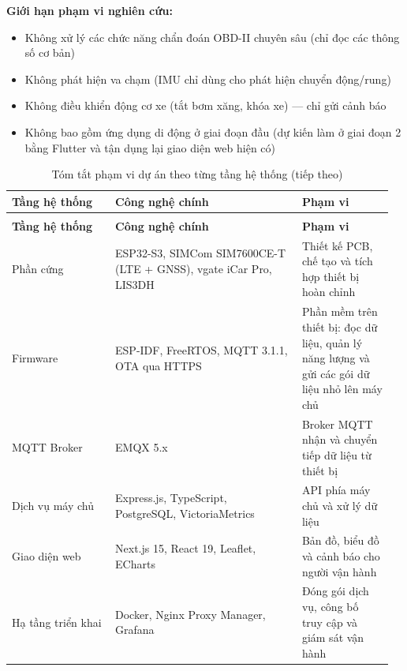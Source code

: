 \documentclass[a4paper]{extarticle}
\newcommand{\thesissettableid}[2]{%
  \renewcommand{\thetable}{#1}%
  \renewcommand{\theHtable}{#2}%
}
\providecommand{\tightlist}{%
  \setlength{\itemsep}{0pt}\setlength{\parskip}{0pt}}
\begin{document}
\textbf{Giới hạn phạm vi nghiên cứu:}

\begin{itemize}
\tightlist
\item
  Không xử lý các chức năng chẩn đoán OBD-II chuyên sâu (chỉ đọc các
  thông số cơ bản)
\item
  Không phát hiện va chạm (IMU chỉ dùng cho phát hiện chuyển động/rung)
\item
  Không điều khiển động cơ xe (tắt bơm xăng, khóa xe) --- chỉ gửi cảnh
  báo
\item
  Không bao gồm ứng dụng di động ở giai đoạn đầu (dự kiến làm ở giai
  đoạn 2 bằng Flutter và tận dụng lại giao diện web hiện có)
\end{itemize}

{\thesissettableid{1.1}{tab-ch1-project-scope-by-layer}
\def\LTcaptype{table}
\begin{longtable}{|L{0.261\linewidth}|L{0.470\linewidth}|L{0.234\linewidth}|}
\caption{Tóm tắt phạm vi dự án theo từng tầng hệ thống}\label{tab:ch1-project-scope-by-layer}\\
\hline \textbf{Tầng hệ thống} & \textbf{Công nghệ chính} & \textbf{Phạm vi} \\
\hline
\endfirsthead
\caption[]{Tóm tắt phạm vi dự án theo từng tầng hệ thống (tiếp theo)}\\
\hline \textbf{Tầng hệ thống} & \textbf{Công nghệ chính} & \textbf{Phạm vi} \\
\hline
\endhead
\hline
\endfoot
\endlastfoot
Phần cứng & ESP32-S3, SIMCom SIM7600CE-T (LTE + GNSS), vgate iCar Pro,
LIS3DH & Thiết kế PCB, chế tạo và tích hợp thiết bị hoàn chỉnh \\\hline
Firmware & ESP-IDF, FreeRTOS, MQTT 3.1.1, OTA qua HTTPS & Phần mềm trên
thiết bị: đọc dữ liệu, quản lý năng lượng và gửi các gói dữ liệu nhỏ lên
máy chủ \\\hline
MQTT Broker & EMQX 5.x & Broker MQTT nhận và chuyển tiếp dữ liệu từ thiết bị \\\hline
Dịch vụ máy chủ & Express.js, TypeScript, PostgreSQL, VictoriaMetrics & API
phía máy chủ và xử lý dữ liệu \\\hline
Giao diện web & Next.js 15, React 19, Leaflet, ECharts & Bản đồ, biểu
đồ và cảnh báo cho người vận hành \\\hline
Hạ tầng triển khai & Docker, Nginx Proxy Manager, Grafana & Đóng gói
dịch vụ, công bố truy cập và giám sát vận hành \\\hline
\end{longtable}
}
\end{document}
